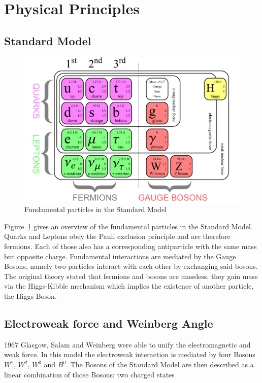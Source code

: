 
\section{Physical Principles}
\subsection{Standard Model}
\begin{figure}[hb]
	\centering
	\includegraphics[scale=0.4]{graphics/SM1.png}
	\caption[Standard Model]{Fundamental particles in the Standard Model}
	\label{fig:principles:Standard_Model_of_Elementary_Particles}
\end{figure}

Figure~\ref{fig:principles:Standard_Model_of_Elementary_Particles} gives an overview of the fundamental particles in the Standard Model. Quarks and Leptons obey the Pauli exclusion principle and are therefore fermions. Each of those also has a corresponding antiparticle with the same mass but opposite charge. Fundamental interactions are mediated by the Gauge Bosons, namely two particles interact with each other by exchanging said bosons. The original theory stated that fermions and bosons are massless, they gain mass via the Higgs-Kibble mechanism which implies the existence of another particle, the Higgs Boson\cite{muenchen}.

\subsection{Electroweak force and Weinberg Angle}
1967 Glasgow, Salam and Weinberg were able to unify the electromagnetic and weak force. In this model the electroweak interaction is mediated by four Bosons $W^1$, $W^2$, $W^3$ and $B^0$. The Bosons of the Standard Model are then described as a linear combination of those Bosons; two charged states


